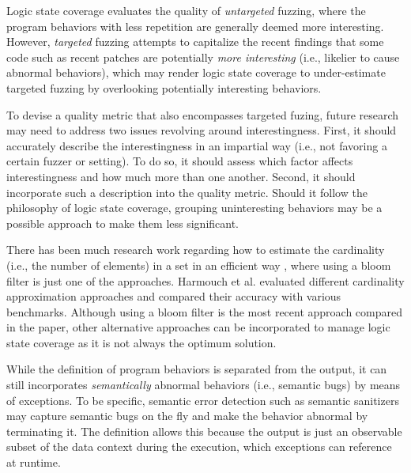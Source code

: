 \documentclass[letterpaper,twocolumn,10pt]{article}
\begin{document}
%
Logic state coverage evaluates the quality of \emph{untargeted} fuzzing, where
the program behaviors with less repetition are generally deemed more
interesting. 
%
However, \emph{targeted} fuzzing
\cite{aflchurn,chen2020savior,osterlund2020parmesan,lee2024syzrisk} attempts to
capitalize the recent findings \cite{aflchurn,zhai2022ndss,nikolaos2022longvuln}
that some code such as recent patches are potentially \emph{more interesting}
(i.e., likelier to cause abnormal behaviors), which may render logic state
coverage to under-estimate targeted fuzzing by overlooking potentially
interesting behaviors.

To devise a quality metric that also encompasses targeted fuzing, future
research may need to address two issues revolving around interestingness. First,
it should accurately describe the interestingness in an impartial way (i.e., not
favoring a certain fuzzer or setting). To do so, it should assess which factor
affects interestingness and how much more than one another. Second, it should
incorporate such a description into the quality metric. Should it follow the
philosophy of logic state coverage, grouping uninteresting behaviors may be a
possible approach to make them less significant.


%
There has been much research work regarding how to estimate the cardinality
(i.e., the number of elements) in a set in an efficient way
\cite{papapetrou2010cardinality,harmouch2017cardinality}, where using a bloom
filter is just one of the approaches. Harmouch et al.
\cite{harmouch2017cardinality} evaluated different cardinality approximation
approaches and compared their accuracy with various benchmarks.  Although using
a bloom filter is the most recent approach compared in the paper, other
alternative approaches can be incorporated to manage logic state coverage as it
is not always the optimum solution.


%
While the definition of program behaviors is separated from the output, it can
still incorporates \emph{semantically} abnormal behaviors (i.e., semantic bugs)
by means of exceptions. To be specific, semantic error detection such as
semantic sanitizers \cite{kim2019hydra,yun2016apisan} may capture semantic bugs
on the fly and make the behavior abnormal by terminating it. The definition
allows this because the output is just an observable subset of the data context
during the execution, which exceptions can reference at runtime.
\end{document}
